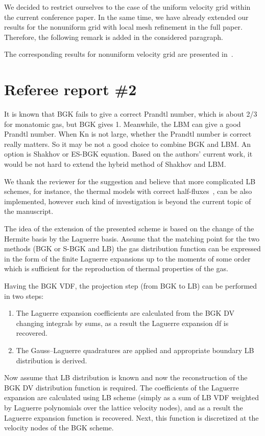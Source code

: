 \documentclass{article}
\begin{document}
We decided to restrict ourselves to the case of the uniform velocity grid within the current conference paper.
In the same time, we have already extended our results for the nonuniform grid with local mesh refinement in the full paper.
Therefore, the following remark is added in the considered paragraph.
\begin{leftbar}
    The corresponding results for nonuniform velocity grid are presented in~\cite{Aristov2019}.
\end{leftbar}

\section*{Referee report \#2}

\begin{quoting}
    It is known that BGK fails to give a correct Prandtl number, which is about 2/3 for monatomic gas, but BGK gives 1.
    Meanwhile, the LBM can give a good Prandtl number.
    When Kn is not large, whether the Prandtl number is correct really matters.
    So it may be not a good choice to combine BGK and LBM.
    An option is Shakhov or ES-BGK equation.
    Based on the authors' current work, it would be not hard to extend the hybrid method of Shakhov and LBM.
\end{quoting}

We thank the reviewer for the suggestion and believe that more complicated LB schemes, for instance,
the thermal models with correct half-fluxes~\cite{Ambrus2016mixed}, can be also implemented,
however such kind of investigation is beyond the current topic of the manuscript.

The idea of the extension of the presented scheme is based on the change of the Hermite basis by the Laguerre basis.
Assume that the matching point for the two methods (BGK or S-BGK and LB) the gas distribution function can be expressed
in the form of the finite Laguerre expansions up to the moments of some order which is sufficient
for the reproduction of thermal properties of the gas.

Having the BGK VDF, the projection step (from BGK to LB) can be performed in two steps:
\begin{enumerate}
    \item The Laguerre expansion coefficients are calculated from the BGK DV changing integrals by sums, as a result
    the Laguerre expansion df is recovered.
    \item The Gauss--Laguerre quadratures are applied and appropriate boundary LB distribution is derived.
\end{enumerate}
Now assume that LB distribution is known and now the reconstruction of the BGK DV distribution function is required.
The coefficients of the Laguerre expansion are calculated using LB scheme
(simply as a sum of LB VDF weighted by Laguerre polynomials over the lattice velocity nodes),
and as a result the Laguerre expansion function is recovered.
Next, this function is discretized at the velocity nodes of the BGK scheme.
\end{document}
